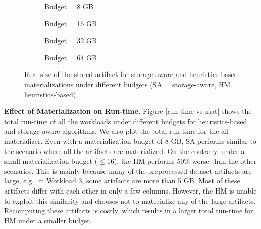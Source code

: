 \begin{figure}
\begin{subfigure}[b]{0.5\linewidth}
\centering
 \resizebox{\columnwidth}{!}{%
%
}
\caption{Budget = 8 GB}
\end{subfigure}%
\begin{subfigure}[b]{0.5\linewidth}
\centering
 \resizebox{\columnwidth}{!}{%
%
}
\caption{Budget = 16 GB}
\end{subfigure}
\begin{subfigure}[b]{0.5\linewidth}
\centering
 \resizebox{\columnwidth}{!}{%
%
}

\caption{Budget = 32 GB}
\end{subfigure}%
\begin{subfigure}[b]{0.5\linewidth}
\centering
 \resizebox{\columnwidth}{!}{%
%
}
\caption{Budget = 64 GB}
\end{subfigure}
\caption{Real size of the stored artifact for storage-aware and heuristics-based materializations under different budgets (SA = storage-aware, HM = heuristics-based)  }
\label{exp-sa-vs-simple-size}
\end{figure}

\textbf{Effect of Materialization on Run-time.}
Figure \ref{run-time-vs-mat} shows the total run-time of all the workloads under different budgets for heuristics-based and storage-aware algorithms.
We also plot the total run-time for the all-materializer.
Even with a materialization budget of 8 GB, SA performs similar to the scenario where all the artifacts are materialized.
On the contrary, under a small materialization budget ($\leq 16$), the HM performs 50\% worse than the other scenarios.
This is mainly because many of the preprocessed dataset artifacts are large, e.g., in Workload 3, some artifacts are more than 5 GB.
Most of these artifacts differ with each other in only a few columns.
However, the HM is unable to exploit this similarity and chooses not to materialize any of the large artifacts.
Recomputing these artifacts is costly, which results in a larger total run-time for HM under a smaller budget.

